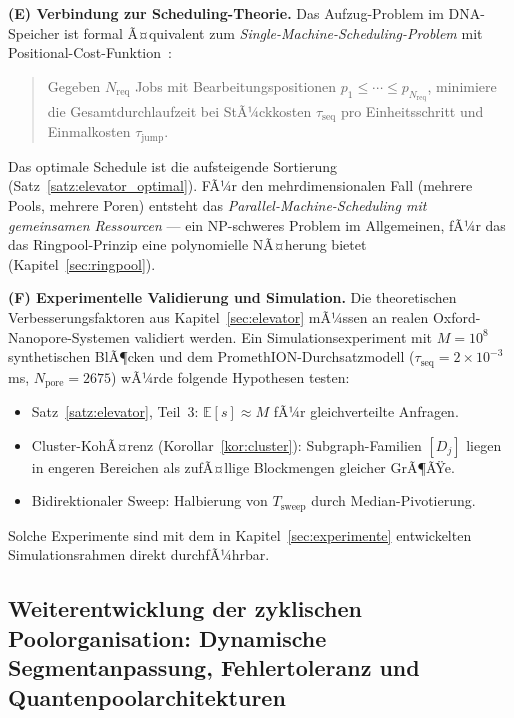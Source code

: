 ﻿\documentclass[a4paper,12pt]{article}
\theoremstyle{definition}
\theoremstyle{plain}
\begin{document}
\textbf{(E) Verbindung zur Scheduling-Theorie.}
Das Aufzug-Problem im DNA-Speicher ist formal Ã¤quivalent zum
\emph{Single-Machine-Scheduling-Problem} mit
Positional-Cost-Funktion~\cite{knuth1998}:
\begin{quote}
  Gegeben $N_{\mathrm{req}}$ Jobs mit Bearbeitungspositionen
  $p_1 \le \cdots \le p_{N_{\mathrm{req}}}$, minimiere die
  Gesamtdurchlaufzeit bei StÃ¼ckkosten $\tau_{\mathrm{seq}}$ pro
  Einheitsschritt und Einmalkosten $\tau_{\mathrm{jump}}$.
\end{quote}
Das optimale Schedule ist die aufsteigende Sortierung (Satz~\ref{satz:elevator_optimal}).
FÃ¼r den mehrdimensionalen Fall (mehrere Pools, mehrere Poren) entsteht
das \emph{Parallel-Machine-Scheduling mit gemeinsamen Ressourcen} ---
ein NP-schweres Problem im Allgemeinen, fÃ¼r das das Ringpool-Prinzip
eine polynomielle NÃ¤herung bietet (Kapitel~\ref{sec:ringpool}).

\textbf{(F) Experimentelle Validierung und Simulation.}
Die theoretischen Verbesserungsfaktoren aus Kapitel~\ref{sec:elevator}
mÃ¼ssen an realen Oxford-Nanopore-Systemen validiert werden.  Ein
Simulationsexperiment mit $M = 10^8$ synthetischen BlÃ¶cken und dem
PromethION-Durchsatzmodell ($\tau_{\mathrm{seq}} = 2 \times 10^{-3}$ ms,
$N_{\mathrm{pore}} = 2675$) wÃ¼rde folgende Hypothesen testen:
\begin{itemize}
  \item Satz~\ref{satz:elevator}, Teil~3: $\mathbb{E}[s] \approx M$
        fÃ¼r gleichverteilte Anfragen.
  \item Cluster-KohÃ¤renz (Korollar~\ref{kor:cluster}):
        Subgraph-Familien $[D_j]$ liegen in engeren Bereichen als
        zufÃ¤llige Blockmengen gleicher GrÃ¶ÃŸe.
  \item Bidirektionaler Sweep: Halbierung von $T_{\mathrm{sweep}}$
        durch Median-Pivotierung.
\end{itemize}
Solche Experimente sind mit dem in Kapitel~\ref{sec:experimente}
entwickelten Simulationsrahmen direkt durchfÃ¼hrbar.

\subsection{Weiterentwicklung der zyklischen Poolorganisation: Dynamische
           Segmentanpassung, Fehlertoleranz und Quantenpoolarchitekturen}
\label{ssec:ausblick_ringpool}
\end{document}
